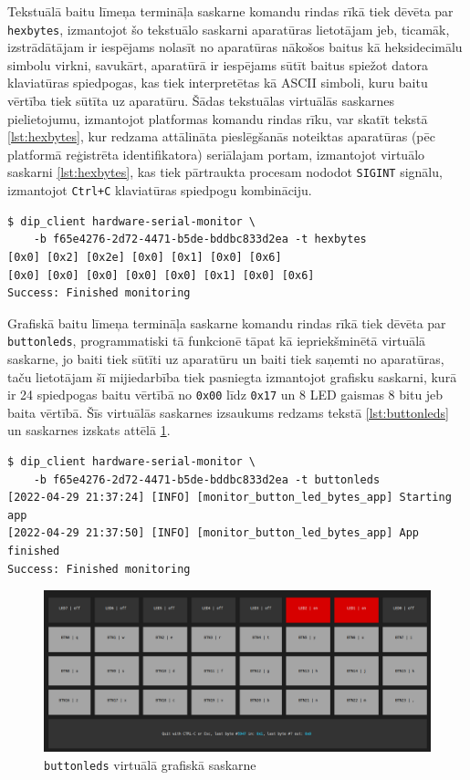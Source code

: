 Tekstuālā baitu līmeņa termināļa saskarne komandu rindas rīkā tiek dēvēta par
\lstinline!hexbytes!, izmantojot šo tekstuālo saskarni aparatūras lietotājam
jeb, ticamāk, izstrādātājam ir iespējams nolasīt no aparatūras nākošos baitus kā
heksidecimālu simbolu virkni, savukārt, aparatūrā ir iespējams sūtīt baitus
spiežot datora klaviatūras spiedpogas, kas tiek interpretētas kā ASCII simboli,
kuru baitu vērtība tiek sūtīta uz aparatūru. Šādas tekstuālas virtuālās
saskarnes pielietojumu, izmantojot platformas komandu rindas rīku, var skatīt
tekstā \ref{lst:hexbytes}, kur redzama attālināta pieslēgšanās noteiktas
aparatūras (pēc platformā reģistrēta identifikatora) seriālajam portam,
izmantojot virtuālo saskarni \ref{lst:hexbytes}, kas tiek pārtraukta procesam
nododot \lstinline!SIGINT! signālu, izmantojot \lstinline!Ctrl+C! klaviatūras
spiedpogu kombināciju.

\begin{lstlisting}[caption={\lstinline!hexbytes! izmantošana no komandu rindas},label={lst:hexbytes},captionpos=b]
$ dip_client hardware-serial-monitor \
    -b f65e4276-2d72-4471-b5de-bddbc833d2ea -t hexbytes
[0x0] [0x2] [0x2e] [0x0] [0x1] [0x0] [0x6] 
[0x0] [0x0] [0x0] [0x0] [0x0] [0x1] [0x0] [0x6]  
Success: Finished monitoring
\end{lstlisting}

Grafiskā baitu līmeņa termināļa saskarne komandu rindas rīkā tiek dēvēta par
\lstinline!buttonleds!, programmatiski tā funkcionē tāpat kā iepriekšminētā
virtuālā saskarne, jo baiti tiek sūtīti uz aparatūru un baiti tiek saņemti no
aparatūras, taču lietotājam šī mijiedarbība tiek pasniegta izmantojot grafisku
saskarni, kurā ir 24 spiedpogas baitu vērtībā no \lstinline!0x00! līdz
\lstinline!0x17! un 8 LED gaismas 8 bitu jeb baita vērtībā. Šīs virtuālās
saskarnes izsaukums redzams tekstā \ref{lst:buttonleds} un saskarnes izskats
attēlā \ref{fig:buttonleds}.

\begin{lstlisting}[caption={\lstinline!buttonleds! izsaukums no komandu rindas},label={lst:buttonleds},captionpos=b]
$ dip_client hardware-serial-monitor \
    -b f65e4276-2d72-4471-b5de-bddbc833d2ea -t buttonleds
[2022-04-29 21:37:24] [INFO] [monitor_button_led_bytes_app] Starting app
[2022-04-29 21:37:50] [INFO] [monitor_button_led_bytes_app] App finished
Success: Finished monitoring
\end{lstlisting}

\begin{figure}[H]
    \includegraphics[width=0.9\linewidth]{assets/buttonleds.png}
    \centering
    \caption{\lstinline!buttonleds! virtuālā grafiskā saskarne}
    \label{fig:buttonleds}
\end{figure}

